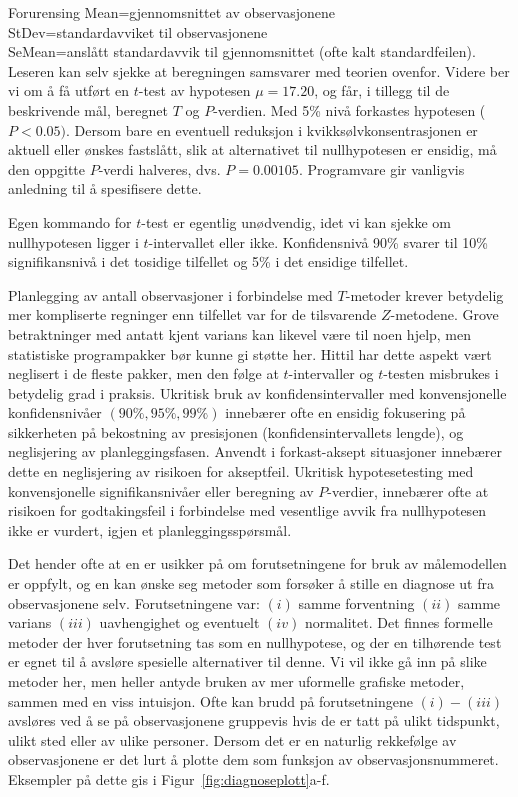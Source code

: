 \begin{eksempel}{Forurensing}
\noindent  Mean=gjennomsnittet av observasjonene \\
StDev=standardavviket til observasjonene  \\
SeMean=anslått standardavvik til gjennomsnittet (ofte kalt standardfeilen).\\
Leseren kan selv sjekke at beregningen samsvarer med teorien ovenfor.
Videre ber vi om å få utført en $t$-test av hypotesen $\mu =17.20$,
og får, i tillegg til de beskrivende mål, beregnet $T$ og 
$P$-verdien. Med 5\% nivå forkastes hypotesen ($P<0.05)$. 
Dersom bare en eventuell reduksjon i kvikk\-sølv\-konsen\-trasjonen
er aktuell eller ønskes fastslått, slik at alternativet til
nullhypotesen er ensidig, må den oppgitte $P$-verdi halveres, dvs.
$P=0.00105$. Programvare gir vanligvis anledning til å spesifisere dette.

Egen kommando for $t$-test er egentlig unødvendig,
idet vi kan sjekke om nullhypotesen ligger i $t$-intervallet eller ikke.
Konfidensnivå 90\% svarer til 10\% signifikansnivå i det tosidige
tilfellet og 5\% i det ensidige tilfellet.
\end{eksempel}

Planlegging av antall observasjoner i forbindelse med $T$-metoder
krever betydelig mer kompliserte regninger enn tilfellet var for
de tilsvarende $Z$-metodene. Grove betraktninger med antatt kjent
varians kan likevel være til noen hjelp, men statistiske
programpakker bør kunne gi støtte her. Hittil har dette
aspekt vært neglisert i de fleste pakker, men den følge at
 $t$-intervaller og $t$-testen misbrukes i betydelig grad i praksis.
Ukritisk bruk av konfidensintervaller med konvensjonelle
konfidensnivåer $(90\%, 95\%,99\%)$ innebærer ofte en
ensidig fokusering på sikkerheten på bekostning av
presisjonen (konfidensintervallets lengde), og neglisjering av
planleggingsfasen. Anvendt i forkast-aksept situasjoner
innebærer dette en neglisjering av risikoen for akseptfeil.
Ukritisk hypotesetesting med konvensjonelle signifikansnivåer
eller beregning av $P$-verdier, innebærer ofte at risikoen for
godtakingsfeil i forbindelse med vesentlige avvik fra
nullhypotesen ikke er vurdert, igjen et
planleggingsspørsmål. 
                               
Det hender ofte at en er usikker på om forutsetningene for
bruk av målemodellen er oppfylt, og en kan ønske seg
metoder som forsøker å stille en diagnose ut fra
observasjonene selv. Forutsetningene var:  $(i)$ samme forventning
$(ii)$ samme varians $(iii)$ uavhengighet og eventuelt $(iv)$
normalitet. Det finnes formelle metoder der hver forutsetning tas
som en nullhypotese, og der en tilhørende test er egnet til
å avsløre spesielle alternativer til denne. Vi vil ikke
gå inn på slike metoder her, men heller antyde bruken av
mer uformelle grafiske metoder, sammen med en viss intuisjon.
Ofte kan brudd på forutsetningene $(i) - (iii)$ avsløres
ved å se på observasjonene gruppevis hvis de er tatt
på ulikt tidspunkt, ulikt sted eller av ulike personer.
Dersom det er en naturlig rekkefølge av observasjonene er det
lurt å plotte dem som funksjon av observasjonsnummeret.
Eksempler på dette gis i Figur~\ref{fig:diagnoseplott}a-f.


